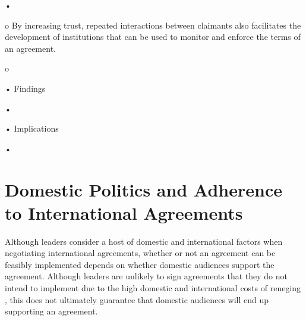 •	







o	By increasing trust, repeated interactions between claimants also facilitates the development of institutions that can be used to monitor and enforce the terms of an agreement. 







o	























•	Findings







•	







•	Implications







•	







\section{Domestic Politics and Adherence to International Agreements}















Although leaders consider a host of domestic and international factors when negotiating international agreements, whether or not an agreement can be feasibly implemented depends on whether domestic audiences support the agreement. Although leaders are unlikely to sign agreements that they do not intend to implement due to the high domestic and international costs of reneging \citep[e.g., ][]{schelling1960, toft2003, zacher2001}, this does not ultimately guarantee that domestic audiences will end up supporting an agreement.















